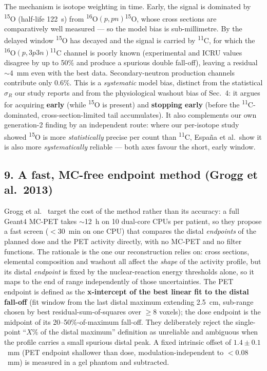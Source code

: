 \documentclass[11pt]{article}
\newcommand{\iso}[2]{\textsuperscript{#1}#2}
\begin{document}
\noindent
The mechanism is isotope weighting in time. Early, the signal is dominated by
\iso{15}{O} (half-life 122~s) from \iso{16}{O}$(p,pn)$\iso{15}{O}, whose cross
sections are comparatively well measured --- so the model bias is sub-millimetre.
By the delayed window \iso{15}{O} has decayed and the signal is carried by
\iso{11}{C}, for which the \iso{16}{O}$(p,3p3n)$\iso{11}{C} channel is poorly
known (experimental and ICRU values disagree by up to 50\% and produce a
spurious double fall-off), leaving a residual $\sim$4~mm even with the best data.
Secondary-neutron production channels contribute only 0.6\%. This is a
\emph{systematic} model bias, distinct from the statistical $\sigma_R$ our study
reports and from the physiological washout bias of Sec.~4: it argues for
acquiring \textbf{early} (while \iso{15}{O} is present) and \textbf{stopping
early} (before the \iso{11}{C}-dominated, cross-section-limited tail
accumulates). It also complements our own generation-2 finding by an independent
route: where our per-isotope study showed \iso{15}{O} is more \emph{statistically}
precise per count than \iso{11}{C}, Espa\~na et al.\ show it is also more
\emph{systematically} reliable --- both axes favour the short, early window.

\subsection*{9. A fast, MC-free endpoint method (Grogg et al.\ 2013)}

Grogg et al.~\cite{grogg2013} target the cost of the method rather than its
accuracy: a full Geant4 MC-PET takes $\sim$12~h on 10 dual-core CPUs per patient,
so they propose a fast screen ($<$30~min on one CPU) that compares the distal
\emph{endpoints} of the planned dose and the PET activity directly, with no
MC-PET and no filter functions. The rationale is the one our reconstruction
relies on: cross sections, elemental composition and washout all affect the
\emph{shape} of the activity profile, but its distal \emph{endpoint} is fixed by
the nuclear-reaction energy thresholds alone, so it maps to the end of range
independently of those uncertainties. The PET endpoint is defined as the
\textbf{x-intercept of the best linear fit to the distal fall-off} (fit window
from the last distal maximum extending 2.5~cm, sub-range chosen by best
residual-sum-of-squares over $\ge 8$ voxels); the dose endpoint is the midpoint
of its 20--50\%-of-maximum fall-off. They deliberately reject the single-point
``$X\%$ of the distal maximum'' definition as unreliable and ambiguous when the
profile carries a small spurious distal peak. A fixed intrinsic offset of
$1.4 \pm 0.1$~mm (PET endpoint shallower than dose, modulation-independent to
$<0.08$~mm) is measured in a gel phantom and subtracted.
\end{document}
